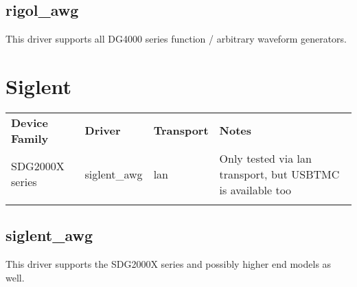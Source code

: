 \subsection{rigol\_awg}

This driver supports all DG4000 series function / arbitrary waveform generators.


\section{Siglent}

\begin{tabularx}{16cm}{lllX}
\thickhline
\textbf{Device Family} & \textbf{Driver} & \textbf{Transport} & \textbf{Notes} \\
\thickhline
SDG2000X series & siglent\_awg & lan & Only tested via lan transport, but USBTMC is available too\\
\thickhline
\end{tabularx}

\subsection{siglent\_awg}

This driver supports the SDG2000X series and possibly higher end models as well.
